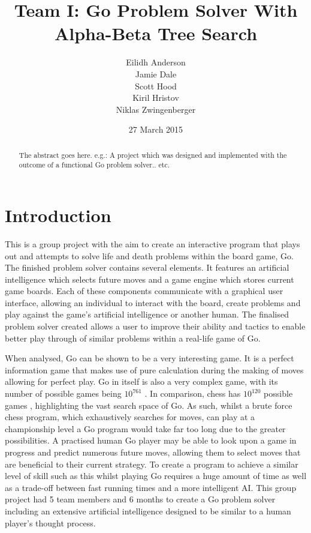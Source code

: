 \documentclass{l3proj}
\begin{document}
\title{Team I: Go Problem Solver With Alpha-Beta Tree Search}
\author{Eilidh Anderson \\
        Jamie Dale \\
        Scott Hood \\
        Kiril Hristov \\
        Niklas Zwingenberger}
\date{27 March 2015}
\maketitle
\begin{abstract}

The abstract goes here.
e.g.: A project which was designed and implemented with the outcome of a functional Go problem solver.. etc.

\end{abstract}
\educationalconsent

\tableofcontents

\chapter{Introduction}
\label{intro}

This is a group project with the aim to create an interactive program that plays out and attempts to solve life and death problems within the board game, Go. The finished problem solver contains several elements. It features an artificial intelligence which selects future moves and a game engine which stores current game boards. Each of these components communicate with a graphical user interface, allowing an individual to interact with the board, create problems and play against the game's artificial intelligence or another human. The finalised problem solver created allows a user to improve their ability and tactics to enable better play through of similar problems within a real-life game of Go.

When analysed, Go can be shown to be a very interesting game. It is a perfect information game that makes use of pure calculation during the making of moves allowing for perfect play. Go in itself is also a very complex game, with its number of possible games being $10^{761}$ \cite{Tromp_2006}. In comparison, chess has $10^{120}$ possible games \cite{Shannon_1988}, highlighting the vast search space of Go. As such, whilst a brute force chess program, which exhaustively searches for moves, can play at a championship level a Go program would take far too long due to the greater possibilities. A practised human Go player may be able to look upon a game in progress and predict numerous future moves, allowing them to select moves that are beneficial to their current strategy. To create a program to achieve a similar level of skill such as this whilst playing Go requires a huge amount of time as well as a trade-off between fast running times and a more intelligent AI. This group project had 5 team members and 6 months to create a Go problem solver including an extensive artificial intelligence designed to be similar to a human player's thought process.
\end{document}
